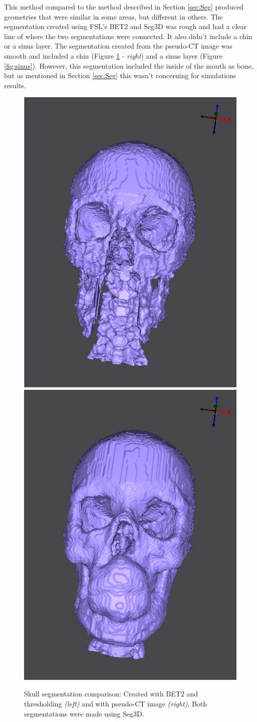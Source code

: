 This method compared to the method described in Section \ref{sec:Seg} produced geometries that were similar in some areas, but different in others. The segmentation created using FSL's BET2 and Seg3D was rough and had a clear line of where the two segmentations were connected. It also didn't include a chin or a sinus layer. The segmentation created from the pseudo-CT image was smooth and included a chin (Figure \ref{fig:skull} - \textit{right}) and a sinus layer (Figure \ref{fig:sinus}). However, this segmentation included the inside of the mouth as bone, but as mentioned in Section \ref{sec:Seg} this wasn't concerning for simulations results.

\begin{figure}[H]
\begin{center}
\includegraphics[width=.49\textwidth]{Figures/skull_before}
\includegraphics[width=.49\textwidth]{Figures/skull_after}
\caption{Skull segmentation comparison: Created with BET2 and thresholding \textit{(left)} and with pseudo-CT image \textit{(right)}. Both segmentations were made using Seg3D.}
\label{fig:skull}
\end{center}
\end{figure}

